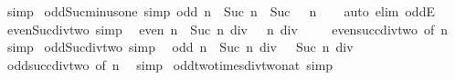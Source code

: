 \begin{isabellebody}
\ simp%
\endisatagproof
{\isafoldproof}%
%
\isadelimproof
\isanewline
%
\endisadelimproof
\isanewline
{}\isamarkupfalse%
\ odd{\isacharunderscore}{\kern0pt}Suc{\isacharunderscore}{\kern0pt}minus{\isacharunderscore}{\kern0pt}one\ {\isacharbrackleft}{\kern0pt}simp{\isacharbrackright}{\kern0pt}{\isacharcolon}{\kern0pt}\ {\isachardoublequoteopen}odd\ n\ {\isasymLongrightarrow}\ Suc\ {\isacharparenleft}{\kern0pt}n\ {\isacharminus}{\kern0pt}\ Suc\ {}{\isacharparenright}{\kern0pt}\ {\isacharequal}{\kern0pt}\ n{\isachardoublequoteclose}\isanewline
%
\isadelimproof
\ \ %
\endisadelimproof
%
\isatagproof
{}\isamarkupfalse%
\ {\isacharparenleft}{\kern0pt}auto\ elim{\isacharcolon}{\kern0pt}\ oddE{\isacharparenright}{\kern0pt}%
\endisatagproof
{\isafoldproof}%
%
\isadelimproof
\isanewline
%
\endisadelimproof
\isanewline
{}\isamarkupfalse%
\ even{\isacharunderscore}{\kern0pt}Suc{\isacharunderscore}{\kern0pt}div{\isacharunderscore}{\kern0pt}two\ {\isacharbrackleft}{\kern0pt}simp{\isacharbrackright}{\kern0pt}{\isacharcolon}{\kern0pt}\isanewline
\ \ {\isachardoublequoteopen}even\ n\ {\isasymLongrightarrow}\ Suc\ n\ div\ {}\ {\isacharequal}{\kern0pt}\ n\ div\ {}{\isachardoublequoteclose}\isanewline
%
\isadelimproof
\ \ %
\endisadelimproof
%
\isatagproof
{}\isamarkupfalse%
\ even{\isacharunderscore}{\kern0pt}succ{\isacharunderscore}{\kern0pt}div{\isacharunderscore}{\kern0pt}two\ {\isacharbrackleft}{\kern0pt}of\ n{\isacharbrackright}{\kern0pt}\ \isamarkupfalse%
\ simp%
\endisatagproof
{\isafoldproof}%
%
\isadelimproof
\isanewline
%
\endisadelimproof
\isanewline
{}\isamarkupfalse%
\ odd{\isacharunderscore}{\kern0pt}Suc{\isacharunderscore}{\kern0pt}div{\isacharunderscore}{\kern0pt}two\ {\isacharbrackleft}{\kern0pt}simp{\isacharbrackright}{\kern0pt}{\isacharcolon}{\kern0pt}\isanewline
\ \ {\isachardoublequoteopen}odd\ n\ {\isasymLongrightarrow}\ Suc\ n\ div\ {}\ {\isacharequal}{\kern0pt}\ Suc\ {\isacharparenleft}{\kern0pt}n\ div\ {}{\isacharparenright}{\kern0pt}{\isachardoublequoteclose}\isanewline
%
\isadelimproof
\ \ %
\endisadelimproof
%
\isatagproof
{}\isamarkupfalse%
\ odd{\isacharunderscore}{\kern0pt}succ{\isacharunderscore}{\kern0pt}div{\isacharunderscore}{\kern0pt}two\ {\isacharbrackleft}{\kern0pt}of\ n{\isacharbrackright}{\kern0pt}\ \isamarkupfalse%
\ simp%
\endisatagproof
{\isafoldproof}%
%
\isadelimproof
\isanewline
%
\endisadelimproof
\isanewline
{}\isamarkupfalse%
\ odd{\isacharunderscore}{\kern0pt}two{\isacharunderscore}{\kern0pt}times{\isacharunderscore}{\kern0pt}div{\isacharunderscore}{\kern0pt}two{\isacharunderscore}{\kern0pt}nat\ {\isacharbrackleft}{\kern0pt}simp{\isacharbrackright}{\kern0pt}{\isacharcolon}{\kern0pt}\isanewline

\end{isabellebody}
